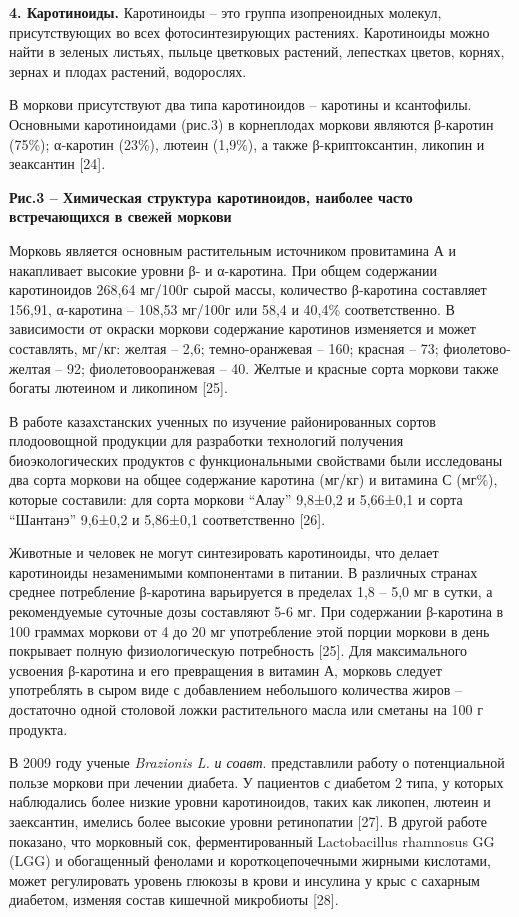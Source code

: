 {\bfseries 4. Каротиноиды.} Каротиноиды -- это группа изопреноидных
молекул, присутствующих во всех фотосинтезирующих растениях. Каротиноиды
можно найти в зеленых листьях, пыльце цветковых растений, лепестках
цветов, корнях, зернах и плодах растений, водорослях.

В моркови присутствуют два типа каротиноидов -- каротины и ксантофилы.
Основными каротиноидами (рис.3) в корнеплодах моркови являются
β-каротин (75\%); α-каротин (23\%), лютеин (1,9\%), а также
β-криптоксантин, ликопин и зеаксантин {[}24{]}.


{\bfseries Рис.3 -- Химическая структура каротиноидов, наиболее часто
встречающихся в свежей моркови}

Морковь является основным растительным источником провитамина А и
накапливает высокие уровни β- и α-каротина. При общем содержании
каротиноидов 268,64 мг/100г сырой массы, количество β-каротина
составляет 156,91, α-каротина -- 108,53 мг/100г или 58,4 и 40,4\%
соответственно. В зависимости от окраски моркови содержание каротинов
изменяется и может составлять, мг/кг: желтая -- 2,6; темно-оранжевая --
160; красная -- 73; фиолетово-желтая -- 92; фиолетовооранжевая -- 40.
Желтые и красные сорта моркови также богаты лютеином и ликопином
{[}25{]}.

В работе казахстанских ученных по изучение районированных сортов
плодоовощной продукции для разработки технологий получения
биоэкологических продуктов с функциональными свойствами были исследованы
два сорта моркови на общее содержание каротина (мг/кг) и витамина С
(мг\%), которые составили: для сорта моркови ``Алау'' 9,8±0,2 и 5,66±0,1
и сорта ``Шантанэ'' 9,6±0,2 и 5,86±0,1 соответственно {[}26{]}.

Животные и человек не могут синтезировать каротиноиды, что делает
каротиноиды незаменимыми компонентами в питании. В различных странах
среднее потребление β-каротина варьируется в пределах 1,8 -- 5,0 мг в
сутки, а рекомендуемые суточные дозы составляют 5-6 мг. При содержании
β-каротина в 100 граммах моркови от 4 до 20 мг употребление этой порции
моркови в день покрывает полную физиологическую потребность {[}25{]}.
Для максимального усвоения β-каротина и его превращения в витамин А,
морковь следует употреблять в сыром виде с добавлением небольшого
количества жиров -- достаточно одной столовой ложки растительного масла
или сметаны на 100 г продукта.

В 2009 году ученые \emph{Brazionis L.} \emph{и соавт}. представлили
работу о потенциальной пользе моркови при лечении диабета. У пациентов с
диабетом 2 типа, у которых наблюдались более низкие уровни каротиноидов,
таких как ликопен, лютеин и заексантин, имелись более высокие уровни
ретинопатии {[}27{]}. В другой работе показано, что морковный сок,
ферментированный Lactobacillus rhamnosus GG (LGG) и обогащенный фенолами
и короткоцепочечными жирными кислотами, может регулировать уровень
глюкозы в крови и инсулина у крыс с сахарным диабетом, изменяя состав
кишечной микробиоты {[}28{]}.


